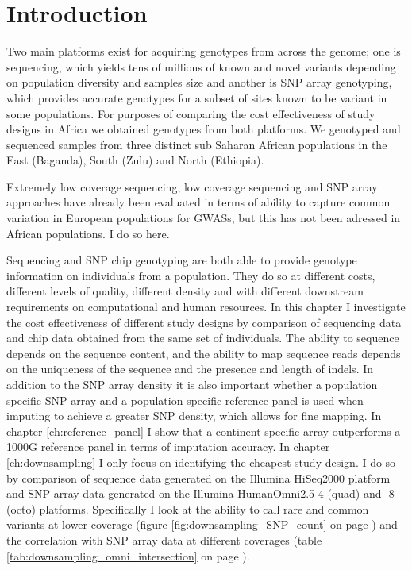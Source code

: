 \section{Introduction}
\label{sec:downsampling_introduction}

Two main platforms exist for acquiring genotypes from across the genome; one is sequencing, which yields tens of millions of known and novel variants depending on population diversity and samples size and another is SNP array genotyping, which provides accurate genotypes for a subset of sites known to be variant in some populations. For purposes of comparing the cost effectiveness of study designs in Africa we obtained genotypes from both platforms. We genotyped and sequenced samples from three distinct sub Saharan African populations in the East (Baganda), South (Zulu) and North (Ethiopia).

Extremely low coverage sequencing, low coverage sequencing and SNP array approaches have already been evaluated in terms of ability to capture common variation in European populations for \glspl{GWAS},\cite{Pasaniuc2012}\cite{10.1371/journal.pcbi.1002604} but this has not been adressed in African populations. I do so here.

Sequencing and \gls{SNP} chip genotyping are both able to provide genotype information on individuals from a population. They do so at different costs, different levels of quality, different density and with different downstream requirements on computational and human resources. In this chapter I investigate the cost effectiveness of different study designs by comparison of sequencing data and chip data obtained from the same set of individuals. The ability to sequence depends on the sequence content, and the ability to map sequence reads depends on the uniqueness of the sequence and the presence and length of indels. In addition to the \gls{SNP} array density it is also important whether a population specific \gls{SNP} array and a population specific reference panel is used when imputing to achieve a greater SNP density, which allows for fine mapping. In chapter \ref{ch:reference_panel} I show that a continent specific array outperforms a 1000G reference panel in terms of imputation accuracy. In chapter \ref{ch:downsampling} I only focus on identifying the cheapest study design. I do so by comparison of sequence data generated on the Illumina HiSeq2000 platform and SNP array data generated on the Illumina HumanOmni2.5-4 (quad) and -8 (octo) platforms. Specifically I look at the ability to call rare and common variants at lower coverage (figure \ref{fig:downsampling_SNP_count} on page \pageref{fig:downsampling_SNP_count}) and the correlation with SNP array data at different coverages (table \ref{tab:downsampling_omni_intersection} on page \pageref{tab:downsampling_omni_intersection}).

